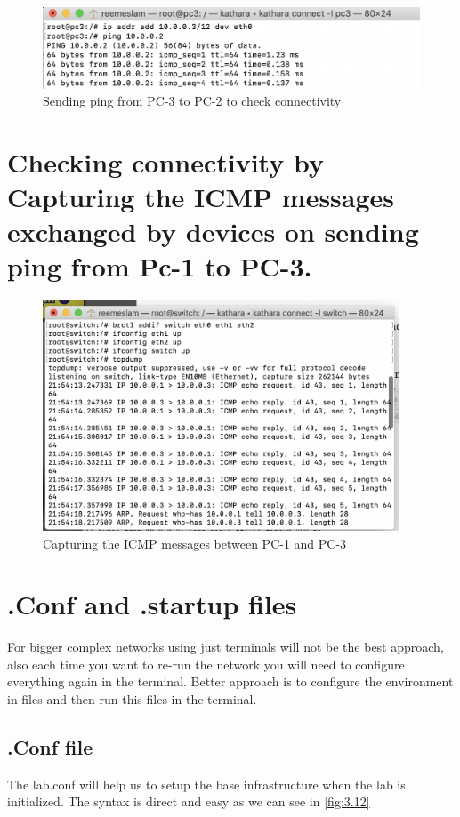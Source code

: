 \begin{figure}[H]
\centering
  \includegraphics[width=500pt]{Images/task5.4.3.png}
  \caption{Sending ping from PC-3 to PC-2 to check connectivity}
  \label{fig:3.10}
\end{figure}

\section{Checking connectivity by Capturing the ICMP messages exchanged by devices on sending ping from Pc-1 to PC-3.}


\begin{figure}[H]
\centering
  \includegraphics[width=300pt]{Images/task5.last.png}
  \caption{Capturing the ICMP messages between PC-1 and PC-3}
  \label{fig:3.11}
\end{figure}

\section{.Conf and .startup files}
For bigger complex networks using just terminals will not be the best approach, also each time you want to re-run the network you will need to configure everything again in the terminal. Better approach is to configure the environment in files and then run this files in the terminal. 
\subsection{.Conf file}
The lab.conf will help us to setup the base infrastructure when the lab is initialized. The syntax is direct and easy as we can see in \ref{fig:3.12}

